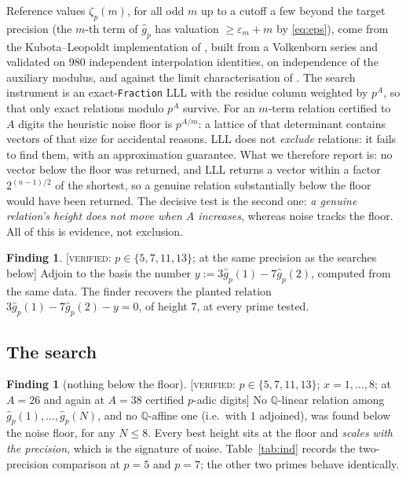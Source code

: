 \documentclass[11pt,reqno]{article}
\newcommand{\QQ}{\mathbb{Q}}
\newcommand{\gh}{\widehat{g}_p}
\newcommand{\VER}[1]{{\normalfont\textsc{[verified:} #1\textsc{]}}}
\theoremstyle{plain}
\theoremstyle{definition}
\newtheorem{finding}[theorem]{Finding}
\theoremstyle{remark}
\numberwithin{equation}{section}
\begin{document}
Reference values $\zeta_p(m)$, for all odd $m$ up to a cutoff a few beyond the
target precision (the $m$-th term of $\gh$ has valuation $\ge\varepsilon_m+m$ by
\eqref{eq:eps}), come from the Kubota--Leopoldt
implementation of \cite[App.~A]{PaperC}, built from a Volkenborn series and
validated on $980$ independent interpolation identities, on independence of the
auxiliary modulus, and against the limit characterisation of
\cite{LSZ2025,BV2025}.  The search instrument is an exact-\texttt{Fraction} LLL
with the residue column weighted by $p^{A}$, so that only exact relations modulo
$p^A$ survive.  For an $m$-term relation certified to $A$ digits the heuristic
noise floor is $p^{A/m}$: a lattice of that determinant contains vectors of that
size for accidental reasons.  LLL does not \emph{exclude} relations: it fails to
find them, with an approximation guarantee.  What we therefore report is: no
vector below the floor was returned, and LLL returns a vector within a factor
$2^{(n-1)/2}$ of the shortest, so a genuine relation substantially below the
floor would have been returned.  The decisive test is the second one:
\emph{a genuine relation's height does not move when $A$ increases}, whereas
noise tracks the floor.  All of this is evidence, not exclusion.

\begin{finding}\label{find:instrument}
\VER{$p\in\{5,7,11,13\}$; at the same precision as the searches below}  Adjoin
to the basis the number $y:=3\gh(1)-7\gh(2)$, computed from the same data.  The
finder recovers the planted relation $3\gh(1)-7\gh(2)-y=0$, of height $7$, at
every prime tested.
\end{finding}

\subsection{The search}

\begin{finding}[nothing below the floor]\label{find:ind}
\VER{$p\in\{5,7,11,13\}$; $x=1,\dots,8$; at $A=26$ and again at $A=38$ certified
$p$-adic digits}  No $\QQ$-linear relation among $\gh(1),\dots,\gh(N)$, and no
$\QQ$-affine one (i.e.\ with $1$ adjoined), was found below the noise floor, for
any $N\le8$.  Every best height sits at the floor and \emph{scales with the
precision}, which is the signature of noise.  Table~\ref{tab:ind} records the
two-precision comparison at $p=5$ and $p=7$; the other two primes behave
identically.
\end{finding}
\end{document}
